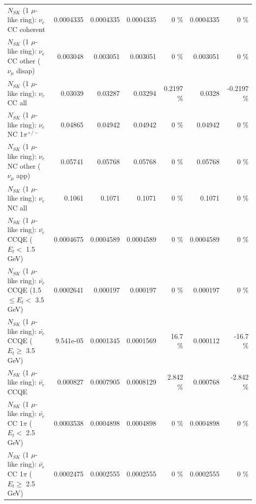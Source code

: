 \begin{table}
\begin{tabular}{| l | r | r | r  r | r  r |}
                               $N_{SK}$ (1 $\mu$-like ring): $\nu_e$ CC coherent &       0.0004335 &       0.0004335 &       0.0004335 &        0 \%  &       0.0004335 &        0 \%  \\ 
                $N_{SK}$ (1 $\mu$-like ring): $\nu_e$ CC other ($\nu_\mu$ disap) &        0.003048 &        0.003051 &        0.003051 &        0 \%  &        0.003051 &        0 \%  \\ 
                                  $N_{SK}$ (1 $\mu$-like ring): $\nu_{e}$ CC all &         0.03039 &         0.03287 &         0.03294 &   0.2197 \%  &          0.0328 &  -0.2197 \%  \\ 
\hline
                           $N_{SK}$ (1 $\mu$-like ring): $\nu_e$ NC 1$\pi^{+/-}$ &         0.04865 &         0.04942 &         0.04942 &        0 \%  &         0.04942 &        0 \%  \\ 
                  $N_{SK}$ (1 $\mu$-like ring): $\nu_e$ NC other ($\nu_\mu$ app) &         0.05741 &         0.05768 &         0.05768 &        0 \%  &         0.05768 &        0 \%  \\ 
                                  $N_{SK}$ (1 $\mu$-like ring): $\nu_{e}$ NC all &          0.1061 &          0.1071 &          0.1071 &        0 \%  &          0.1071 &        0 \%  \\ 
\hline
\hline
\hline
            $N_{SK}$ (1 $\mu$-like ring): $\bar{\nu_e}$ CCQE ($E_{t} <$ 1.5 GeV) &       0.0004675 &       0.0004589 &       0.0004589 &        0 \%  &       0.0004589 &        0 \%  \\ 
   $N_{SK}$ (1 $\mu$-like ring): $\bar{\nu_e}$ CCQE (1.5 $\leq E_{t} <$ 3.5 GeV) &       0.0002641 &        0.000197 &        0.000197 &        0 \%  &        0.000197 &        0 \%  \\ 
         $N_{SK}$ (1 $\mu$-like ring): $\bar{\nu_e}$ CCQE ($E_{t} \geq$ 3.5 GeV) &       9.541e-05 &       0.0001345 &       0.0001569 &     16.7 \%  &        0.000112 &    -16.7 \%  \\ 
\hline
                                $N_{SK}$ (1 $\mu$-like ring): $\bar{\nu_e}$ CCQE &        0.000827 &       0.0007905 &       0.0008129 &    2.842 \%  &        0.000768 &   -2.842 \%  \\ 
\hline
       $N_{SK}$ (1 $\mu$-like ring): $\bar{\nu_e}$ CC 1$\pi$ ($E_{t} <$ 2.5 GeV) &       0.0003538 &       0.0004898 &       0.0004898 &        0 \%  &       0.0004898 &        0 \%  \\ 
    $N_{SK}$ (1 $\mu$-like ring): $\bar{\nu_e}$ CC 1$\pi$ ($E_{t} \geq$ 2.5 GeV) &       0.0002475 &       0.0002555 &       0.0002555 &        0 \%  &       0.0002555 &        0 \%  \\ 

\end{tabular}
\end{table}
